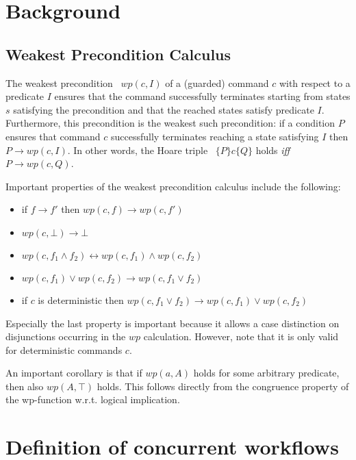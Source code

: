 \documentclass[11pt]{article}
\begin{document}
\section{Background}

\subsection{Weakest Precondition Calculus}

The weakest precondition~\cite{Dijkstra1976} $wp(c,I)$ of a (guarded) command $c$ with respect to a predicate $I$ ensures that the command successfully terminates starting from states $s$ satisfying the precondition and that the reached states satisfy predicate $I$. Furthermore, this precondition is the weakest such precondition: if a condition $P$ ensures that command $c$ successfully terminates reaching a state satisfying $I$ then $P \longrightarrow wp(c,I)$. In other words, the Hoare triple~\cite{Hoare1969} $\{P\} c \{Q\}$ holds \textit{iff} $P \longrightarrow wp(c,Q)$.

Important properties of the weakest precondition calculus include the following:

\begin{itemize}
  \item if $f \longrightarrow f'$ then $wp(c,f) \longrightarrow wp(c,f')$
  \item $wp(c,\bot) \longrightarrow \bot$
  \item $wp(c,f_1 \land f_2) \longleftrightarrow wp(c,f_1) \land wp(c,f_2)$
  \item $wp(c,f_1) \lor wp(c,f_2) \longrightarrow wp(c,f_1 \lor f_2)$
  \item if $c$ is deterministic then $wp(c,f_1 \lor f_2) \longrightarrow wp(c,f_1) \lor wp(c,f_2)$
\end{itemize}

Especially the last property is important because it allows a case distinction on disjunctions occurring in the $wp$ calculation. However, note that it is only valid for deterministic commands $c$.

An important corollary is that if $wp(a,A)$ holds for some arbitrary predicate, then also $wp(A,\top)$ holds. This follows directly from the congruence property of the wp-function w.r.t. logical implication.


\section{Definition of concurrent workflows}
\end{document}
